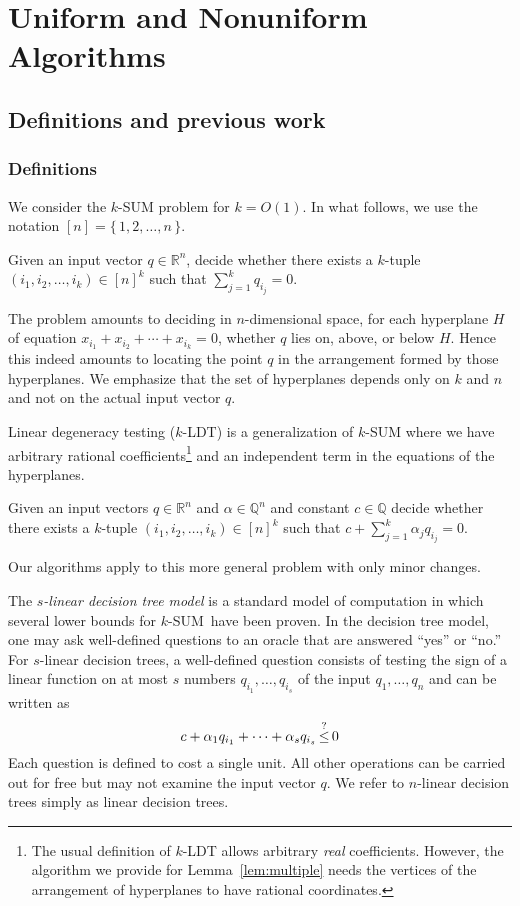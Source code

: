 \section{Uniform and Nonuniform Algorithms}

\subsection{Definitions and previous work}

\subsubsection{Definitions}
We consider the \(k\)-SUM problem for \(k=O(1)\). In what follows, we use the
notation \([n] = \{\,1,2,\ldots ,n\,\}\).
\begin{problem}[\(k\)-SUM]
 Given an input vector \(q\in\mathbb{R}^n\), decide whether there exists a
 $k$-tuple \((i_1, i_2,\ldots ,i_k) \in {[n]}^k\) such that \(\sum_{j=1}^k
 q_{i_j} = 0\).
\end{problem}
The problem amounts to deciding in $n$-dimensional space, for each hyperplane
\(H\) of equation \(x_{i_1} + x_{i_2} + \cdots +x_{i_k} = 0\), whether \(q\)
lies on, above, or below \(H\). Hence this indeed amounts to locating the point
$q$ in the arrangement formed by those hyperplanes. We emphasize that the set
of hyperplanes depends only on $k$ and $n$ and not on the actual input vector
$q$.

Linear degeneracy testing (\(k\)-LDT) is a generalization of \(k\)-SUM where we
have arbitrary rational coefficients\footnote{The usual definition of \(k\)-LDT
allows arbitrary \emph{real} coefficients. However, the algorithm we provide
for Lemma~\ref{lem:multiple} needs the vertices of the arrangement of
hyperplanes to have rational coordinates.}
and an independent term in the equations
of the hyperplanes.
\begin{problem}[\(k\)-LDT]
 Given an input vectors \(q\in\mathbb{R}^n\) and
 $\alpha \in \mathbb{Q}^n$ and constant $c \in \mathbb{Q}$
 decide whether there exists a
 $k$-tuple \((i_1, i_2,\ldots ,i_k) \in {[n]}^k\) such that
 \(c + \sum_{j=1}^k \alpha_j q_{i_j} = 0\).
 \end{problem}
Our algorithms apply to this more general problem with only minor changes.

The \emph{\(s\)-linear decision tree model} is a standard model of computation
in which several lower bounds for \(k\)-SUM\ have been proven. In the decision tree
model, one may ask well-defined questions to an oracle that are answered
``yes'' or ``no.'' For $s$-linear decision trees, a well-defined question consists
of testing the sign of a linear function on at most \(s\) numbers \(q_{i_1},\ldots,q_{i_s}\) of the
input \(q_1,\ldots,q_n\) and can be written as
$$
	c + \alpha_1 q_{i_1} + \cdots + \alpha_s q_{i_s} \mathop{\le}^{?} 0
$$
Each question is defined to cost a single unit. All other operations can be
carried out for free but may not examine the input vector $q$. We refer to
$n$-linear decision trees simply as linear decision trees.


